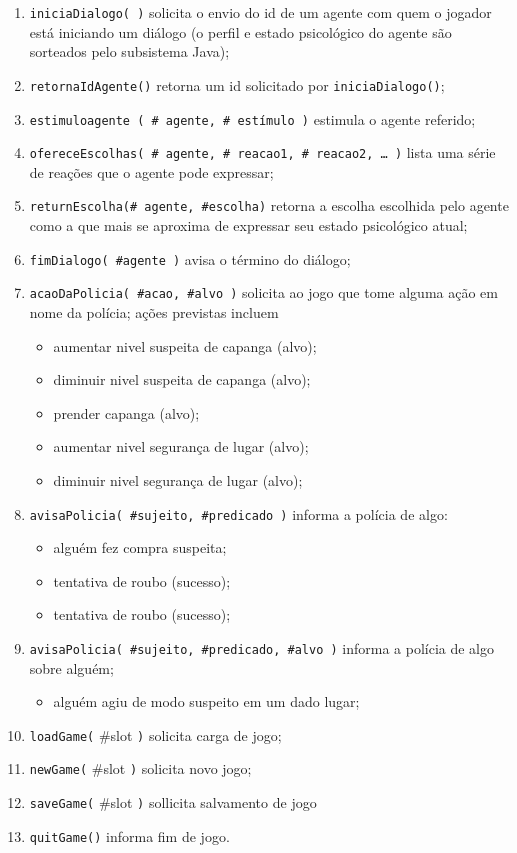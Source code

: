 \begin{enumerate}\footnotesize
\item \verb!iniciaDialogo( )! solicita o envio do id de um agente com
  quem o jogador está iniciando um diálogo (o perfil e estado
  psicológico do agente são sorteados pelo subsistema Java);
\item \verb!retornaIdAgente()! retorna um id solicitado por \verb!iniciaDialogo()!;
%
\item \verb!estimuloagente ( # agente, # estímulo )! estimula o agente
  referido;
%
\item \verb!ofereceEscolhas( # agente, # reacao1, # reacao2, … )!
 lista uma série de reações que o agente pode expressar;
\item \verb!returnEscolha(# agente, #escolha)! retorna a escolha
  escolhida pelo agente como a que mais se aproxima de expressar seu
  estado psicológico atual;
%
%
\item \verb!fimDialogo( #agente )! avisa o término do diálogo;
\item \verb!acaoDaPolicia( #acao, #alvo )! solicita ao jogo que tome
  alguma ação em nome da polícia; ações previstas incluem
  \begin{itemize} 
  \item  aumentar nivel suspeita de capanga (alvo);
  \item  diminuir nivel suspeita de capanga (alvo);
  \item  prender  capanga (alvo);
  \item  aumentar nivel segurança de lugar (alvo);
  \item  diminuir nivel segurança de lugar (alvo);
  \end{itemize}
%
\item \verb!avisaPolicia( #sujeito, #predicado )! informa a polícia de
  algo:
  \begin{itemize}
  \item alguém fez compra suspeita;
    \item tentativa de roubo (sucesso);
      \item tentativa de roubo (sucesso);
  \end{itemize}
\item \verb!avisaPolicia( #sujeito, #predicado, #alvo )! informa a
  polícia de algo sobre alguém;
  \begin{itemize}
  \item alguém agiu de modo suspeito em um dado lugar;
  \end{itemize}
%
\item \verb!loadGame(! \#slot \verb!)! solicita carga de jogo;
\item \verb!newGame(! \#slot \verb!)! solicita novo jogo;
\item \verb!saveGame(! \#slot \verb!)! sollicita salvamento de jogo
\item \verb!quitGame()! informa fim de jogo.
\end{enumerate}

